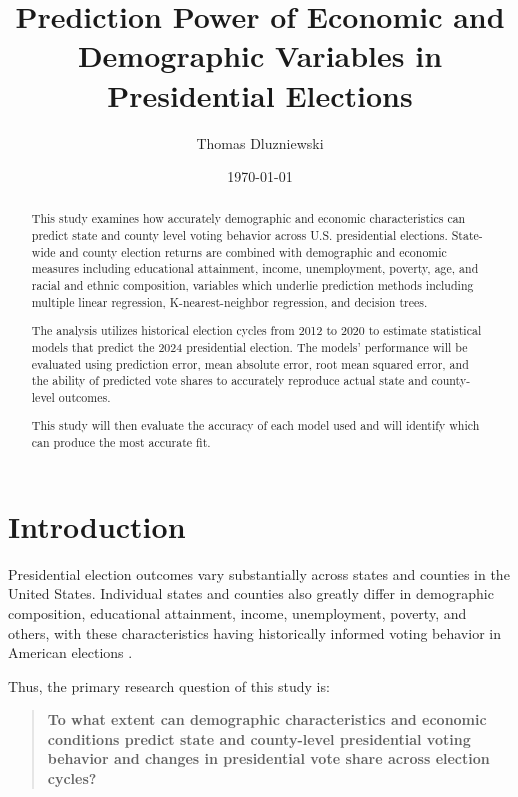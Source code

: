 \documentclass[12pt]{article}
\title{ Prediction Power of Economic and Demographic Variables in Presidential Elections }
\author{Thomas Dluzniewski}
\date{\today}
\begin{document}
	
	\maketitle
	
	\begin{abstract}
		
		This study examines how accurately demographic and economic characteristics can predict state and county level voting behavior
		across U.S. presidential elections. State-wide and county election returns are
		combined with demographic and economic measures including educational
		attainment, income, unemployment, poverty, age, and racial and ethnic
		composition, variables which underlie prediction methods including multiple linear regression, K-nearest-neighbor regression, and decision trees.
		
		The analysis utilizes historical election cycles from 2012 to 2020 to estimate statistical
		models that predict the 2024 presidential election. The models' performance will be
		evaluated using prediction error, mean absolute error, root mean
		squared error, and the ability of predicted vote shares to accurately reproduce
		actual state and county-level outcomes.
		
		This study will then evaluate the accuracy of each model used and will identify which can produce the most accurate fit.
		
	\end{abstract}
	
	
	\section{Introduction}
	
	Presidential election outcomes vary substantially across states and counties in
	the United States. Individual states and counties also greatly differ in demographic composition,
	educational attainment, income, unemployment, poverty, and others, with these characteristics having historically informed voting behavior in American elections  \cite{levernier2006}\cite{erikson1989}.
	
	Thus, the primary research question of this study is:
	
	\begin{quote}
		\textbf{To what extent can demographic characteristics and economic conditions
		predict state and county-level presidential voting behavior and changes in
		presidential vote share across election cycles?}
	\end{quote}
	
\end{document}
